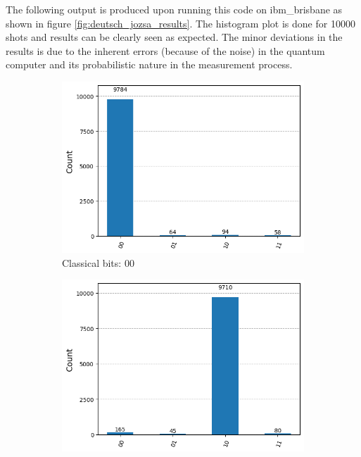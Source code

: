 \documentclass[12pt, oneside]{book}
\theoremstyle{definition}
\theoremstyle{definition}
\theoremstyle{remark}
\begin{document}
\begin{enumerate}
    The following output is produced upon running this code on ibm\_brisbane as shown in figure \ref{fig:deutsch_jozsa_results}. The histogram plot is done for 10000 shots and results can be clearly seen as expected. The minor deviations in the results is due to the inherent errors (because of the noise) in the quantum computer and its probabilistic nature in the measurement process.
    \begin{figure}
        \centering
        \begin{subfigure}[b]{0.45\linewidth}
        \centering
        \includegraphics[width=1\linewidth]{../images/results_superdense_00.png}
        \caption{Classical bits: 00}
        \label{fig:results_superdense_00}
        \end{subfigure}
        \hfill
        \centering
        \begin{subfigure}[b]{0.45\linewidth}
        \centering
        \includegraphics[width=1\linewidth]{../images/results_superdense_01.png}

\end{subfigure}
\end{figure}
\end{enumerate}
\end{document}
